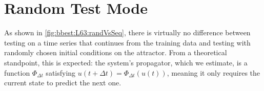 \documentclass{article}
\newcommand{\stepsize}{\Delta\!t}
\begin{document}
\renewcommand{\theHequation}{S\arabic{equation}}
\renewcommand{\theHfigure}{S\arabic{figure}}
\renewcommand{\theHtable}{S\arabic{table}}
\renewcommand{\theHsection}{S\arabic{section}}
\renewcommand{\theHsubsection}{\thesection.\arabic{subsection}}
\renewcommand{\theHtheorem}{\thesection.\arabic{theorem}}
\def\theHpage{S\arabic{page}}

\setcounter{equation}{0}
\setcounter{figure}{0}
\setcounter{table}{0}
\setcounter{section}{0}
\setcounter{subsection}{0}
\setcounter{theorem}{0}

\makeatletter
\renewcommand*\l@section[2]{%
  \ifnum \c@tocdepth >\z@
    \addpenalty\@secpenalty
    \addvspace{1.0em \@plus\p@}%
    \setlength\@tempdima{2.6em}%
    \begingroup
      \parindent \z@ \rightskip \@pnumwidth
      \parfillskip -\@pnumwidth
      \leavevmode \bfseries
      \advance\leftskip\@tempdima
      \hskip -\leftskip
      #1\nobreak\hfil \nobreak\hb@xt@\@pnumwidth{\hss #2}\par
    \endgroup
  \fi}
\renewcommand*\l@subsection{\@dottedtocline{2}{2.6em}{3.5em}}%
\renewcommand*\l@subsubsection{\@dottedtocline{3}{6.1em}{4.4em}}%
\renewcommand\@pnumwidth{2.2em}%
\renewcommand\@tocrmarg{3.2em}%
\makeatother
%
\tableofcontents
%
\clearpage
\section{Random Test Mode}\label{app:sec:randVsSeq}
%
As shown in \cref{fig:bbest:L63:randVsSeq}, there is virtually no difference between testing on a time series that continues from the training data and testing with randomly chosen initial conditions on the attractor. From a theoretical standpoint, this is expected: the system's propagator, which we estimate, is a function $\Phi_{\stepsize}$ satisfying $u(t + \stepsize) = \Phi_{\stepsize}(u(t))$, meaning it only requires the current state to predict the next one.
\end{document}
